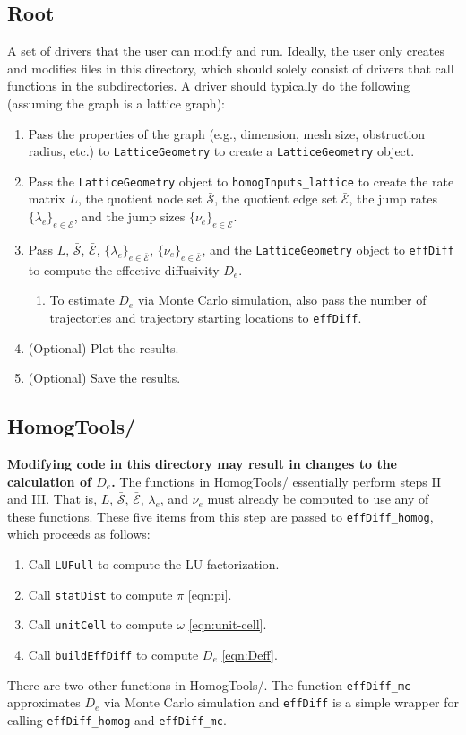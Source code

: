 \documentclass[11pt, oneside]{article}   	%
\theoremstyle{definition}
\newcommand\sS{\mathcal{S}}
\newcommand\sE{\mathcal{E}}
\newcommand\oS{\bar{\sS}}
\newcommand\oE{\bar{\sE}}
\begin{document}
\subsection{Root}
A set of drivers that the user can modify and run. Ideally, the user only creates and modifies files in this directory, which should solely consist of drivers that call functions in the subdirectories. A driver should typically do the following (assuming the graph is a lattice graph):
\begin{enumerate}
	\item Pass the properties of the graph (e.g., dimension, mesh size, obstruction radius, etc.) to \texttt{LatticeGeometry} to create a \texttt{LatticeGeometry} object.
	\item Pass the \texttt{LatticeGeometry} object to \texttt{homogInputs\_lattice} to create the rate matrix $L$, the quotient node set $\oS$, the quotient edge set $\oE$, the jump rates $\{\lambda_e\}_{e \in \oE}$, and the jump sizes $\{\nu_e\}_{e \in \oE}$.
	\item Pass $L$, $\oS$, $\oE$, $\{\lambda_e\}_{e \in \oE}$, $\{\nu_e\}_{e \in \oE}$, and the \texttt{LatticeGeometry} object to \texttt{effDiff} to compute the effective diffusivity $D_e$.
	\begin{enumerate}
		\item To estimate $D_e$ via Monte Carlo simulation, also pass the number of trajectories and trajectory starting locations to \texttt{effDiff}.
	\end{enumerate}
	\item (Optional) Plot the results.
	\item (Optional) Save the results.
\end{enumerate}

\subsection{HomogTools/}
{\bf Modifying code in this directory may result in changes to the calculation of $D_e$.} The functions in HomogTools/ essentially perform steps II and III. That is, $L$, $\oS$, $\oE$, $\lambda_e$, and $\nu_e$ must already be computed to use any of these functions. These five items from this step are passed to \texttt{effDiff\_homog}, which proceeds as follows:
\begin{enumerate}
	\item Call \texttt{LUFull} to compute the LU factorization.
	\item Call \texttt{statDist} to compute $\pi$ \eqref{eqn:pi}.
	\item Call \texttt{unitCell} to compute $\omega$ \eqref{eqn:unit-cell}.
	\item Call \texttt{buildEffDiff} to compute $D_e$ \eqref{eqn:Deff}.
\end{enumerate}
There are two other functions in HomogTools/. The function \texttt{effDiff\_mc} approximates $D_e$ via Monte Carlo simulation and \texttt{effDiff} is a simple wrapper for calling \texttt{effDiff\_homog} and \texttt{effDiff\_mc}.
\end{document}
